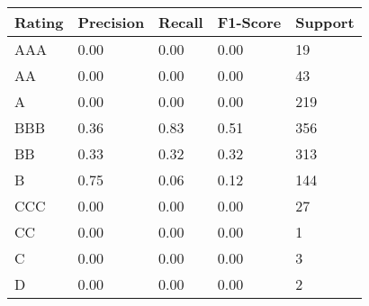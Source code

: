 \begin{tabular}{lllll}
\toprule
Rating & Precision & Recall & F1-Score & Support \\
\midrule
AAA & 0.00 & 0.00 & 0.00 & 19 \\
AA & 0.00 & 0.00 & 0.00 & 43 \\
A & 0.00 & 0.00 & 0.00 & 219 \\
BBB & 0.36 & 0.83 & 0.51 & 356 \\
BB & 0.33 & 0.32 & 0.32 & 313 \\
B & 0.75 & 0.06 & 0.12 & 144 \\
CCC & 0.00 & 0.00 & 0.00 & 27 \\
CC & 0.00 & 0.00 & 0.00 & 1 \\
C & 0.00 & 0.00 & 0.00 & 3 \\
D & 0.00 & 0.00 & 0.00 & 2 \\
\bottomrule
\end{tabular}
